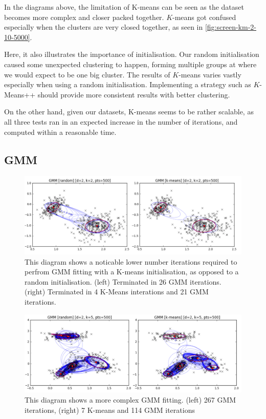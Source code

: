 \documentclass[11pt,openright,a4paper]{article}
\numberwithin{equation}{section}
\begin{document}
In the diagrams above, the limitation of K-means can be seen as the dataset becomes more complex and closer packed together. $K$-means got confused especially when the clusters are very closed together, as seen in \autoref{fig:screen-km-2-10-5000}. 

Here, it also illustrates the importance of initialisation. Our random initialisation caused some unexpected clustering to happen, forming multiple groups at where we would expect to be one big cluster. The results of $K$-means varies vastly especially when using a random initialisation. Implementing a strategy such as $K$-Means++ should provide more consistent results with better clustering.

On the other hand, given our datasets, K-means seems to be rather scalable, as all three tests ran in an expected increase in the number of iterations, and computed within a reasonable time.

\subsection{GMM} \label{ssec:results-GMM}
\begin{figure}[H]
  \centering
  \includegraphics[width=1\textwidth]{screen-gmm-2-2-500}
    \caption{This diagram shows a noticable lower number iterations required to perfrom GMM fitting with a K-means initialisation, as opposed to a random initialisation. (left) Terminated in 26 GMM iterations. (right) Terminated in 4 K-Means interations and 21 GMM iterations.}
  \label{fig:screen-gmm-2-2-500}
\end{figure} 

\begin{figure}[H]
  \centering
  \includegraphics[width=1\textwidth]{screen-gmm-2-5-500}
    \caption{This diagram shows a more complex GMM fitting. (left) 267 GMM iterations, (right) 7 K-means and 114 GMM iterations}
  \label{fig:screen-gmm-2-5-500}
\end{figure} 
\end{document}
